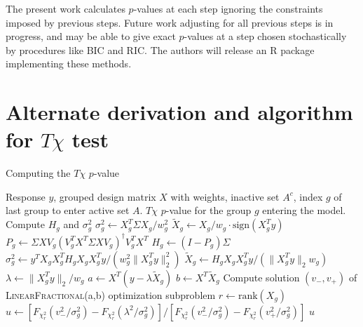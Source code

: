 \documentclass{imsart}
\newcommand{\norm}[1]{\lVert #1 \rVert}
\begin{document}
The present work calculates $p$-values at each step ignoring the constraints
imposed by previous steps. Future work adjusting for all previous steps
is in progress, and may be able to give exact $p$-values at a step chosen
stochastically by procedures like BIC and RIC. The authors will
release an R package implementing these methods.


%


\appendix
\section{Alternate derivation and algorithm for $T\chi$ test}
\label{app:algo}

\begin{algorithm}
 \caption{Computing the $T\chi$ $p$-value}
 \label{algo:pval}
 \begin{algorithmic}
   \REQUIRE Response $y$, grouped design matrix $X$ with weights, inactive set $A^c$, index $g$ of last group to enter active set $A$.
   \ENSURE $T\chi$ $p$-value for the group $g$ entering the model.
   \STATE Compute $H_g$ and $\sigma^2_g$
   \STATE $\sigma_g^2 \gets X_g^T\Sigma X_g/w_g^2$
   \STATE $\tilde X_g \gets X_g / w_g \cdot \text{sign}(X_g^Ty)$
   \ELSE
   \STATE $P_g \gets \Sigma XV_g (V_g^T X^T \Sigma X V_g)^\dagger V_g^TX^T$
   \STATE $H_g \gets (I - P_g)\Sigma$
   \STATE $\sigma^2_g \gets y^TX_gX_g^T H_g X_gX_g^Ty / (w_g^2 \norm{X_g^Ty}_2^2)$
   \STATE $\tilde X_g \gets H_g X_g X_g^T y /(\norm{X_g^Ty}_2 w_g)$
   \ENDIF
   \STATE $\lambda \gets \norm{X_g^Ty}_2/w_g$
   \STATE {}
   \STATE $a \gets X^T(y - \lambda \tilde X_g)$
   \STATE $b \gets X^T \tilde X_g$
   \STATE Compute solution $(v_-, v_+)$ of \textsc{LinearFractional}(a,b) optimization subproblem
   \STATE $r \gets \text{rank}(X_g)$
   \STATE $u \gets [F_{\chi^2_r}(v^2_-/\sigma_g^2) - F_{\chi^2_r}(\lambda^2/\sigma_g^2)]/[F_{\chi^2_r}(v^2_-/\sigma_g^2) - F_{\chi^2_r}(v^2_+/\sigma_g^2)]$
   \RETURN $u$
 \end{algorithmic}
\end{algorithm}
\end{document}
